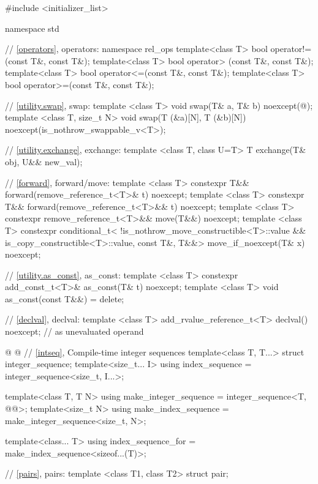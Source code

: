 \begin{codeblock}
#include <initializer_list>

namespace std {
  // \ref{operators}, operators:
  namespace rel_ops {
    template<class T> bool operator!=(const T&, const T&);
    template<class T> bool operator> (const T&, const T&);
    template<class T> bool operator<=(const T&, const T&);
    template<class T> bool operator>=(const T&, const T&);
  }

  // \ref{utility.swap}, swap:
  template <class T> void swap(T& a, T& b) noexcept(@\seebelow@);
  template <class T, size_t N> void swap(T (&a)[N], T (&b)[N]) noexcept(is_nothrow_swappable_v<T>);

  // \ref{utility.exchange}, exchange:
  template <class T, class U=T> T exchange(T& obj, U&& new_val);

  // \ref{forward}, forward/move:
  template <class T> 
    constexpr T&& forward(remove_reference_t<T>& t) noexcept;
  template <class T>
    constexpr T&& forward(remove_reference_t<T>&& t) noexcept;
  template <class T>
    constexpr remove_reference_t<T>&& move(T&&) noexcept;
  template <class T>
    constexpr conditional_t<
    !is_nothrow_move_constructible<T>::value && is_copy_constructible<T>::value,
    const T&, T&&> move_if_noexcept(T& x) noexcept;

  // \ref{utility.as_const}, as_const:
  template <class T> constexpr add_const_t<T>& as_const(T& t) noexcept;
  template <class T> void as_const(const T&&) = delete;

  // \ref{declval}, declval:
  template <class T>
    add_rvalue_reference_t<T> declval() noexcept;  // as unevaluated operand

@
%
%
%
@
  // \ref{intseq}, Compile-time integer sequences
  template<class T, T...> struct integer_sequence;
  template<size_t... I>
    using index_sequence = integer_sequence<size_t, I...>;

  template<class T, T N>
    using make_integer_sequence = integer_sequence<T, @\seebelow{}@>;
  template<size_t N>
    using make_index_sequence = make_integer_sequence<size_t, N>;

  template<class... T>
    using index_sequence_for = make_index_sequence<sizeof...(T)>;

  // \ref{pairs}, pairs:
  template <class T1, class T2> struct pair;

}
\end{codeblock}

